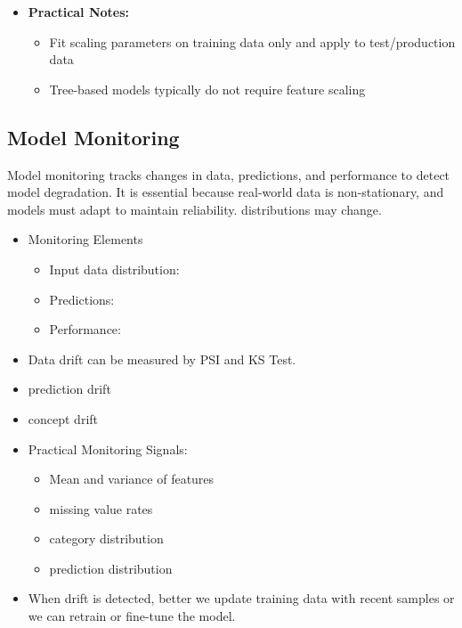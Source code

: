 \documentclass[10pt,a4paper]{article}
\begin{document}
\begin{itemize}
		\item \textbf{Practical Notes:}
		\begin{itemize}
			\item Fit scaling parameters on training data only and apply to test/production data
			\item Tree-based models typically do not require feature scaling
		\end{itemize}
	\end{itemize}

	\subsection{Model Monitoring}
	Model monitoring tracks changes in data, predictions, and performance to detect model degradation. It is essential because real-world data is non-stationary, and models must adapt to maintain reliability. distributions may change.
	\begin{itemize}
		\item Monitoring Elements
		\begin{itemize}
			\item Input data distribution:
			\item Predictions:
			\item Performance:
		\end{itemize}
		\item Data drift can be measured by PSI and KS Test.
		\item prediction drift
		\item concept drift
		\item Practical Monitoring Signals:
		\begin{itemize}
			\item Mean and variance of features
			\item missing value rates
			\item category distribution
			\item prediction distribution
		\end{itemize}
		\item When drift is detected, better we update training data with recent samples or we can retrain or fine-tune the model.
	\end{itemize}

	
	\newpage
\end{document}
